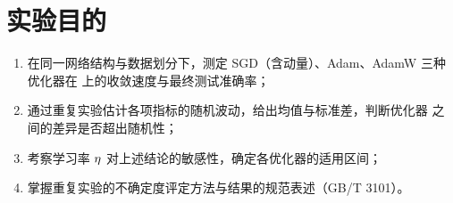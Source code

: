 \section{实验目的}
\label{sec:objective}

\begin{enumerate}
  \item 在同一网络结构与数据划分下，测定 SGD（含动量）、Adam、AdamW 三种
        优化器在 \dataset{} 上的收敛速度与最终测试准确率；
  \item 通过重复实验估计各项指标的随机波动，给出均值与标准差，判断优化器
        之间的差异是否超出随机性；
  \item 考察学习率 $\eta$ 对上述结论的敏感性，确定各优化器的适用区间；
  \item 掌握重复实验的不确定度评定方法与结果的规范表述（GB/T 3101）。
\end{enumerate}
